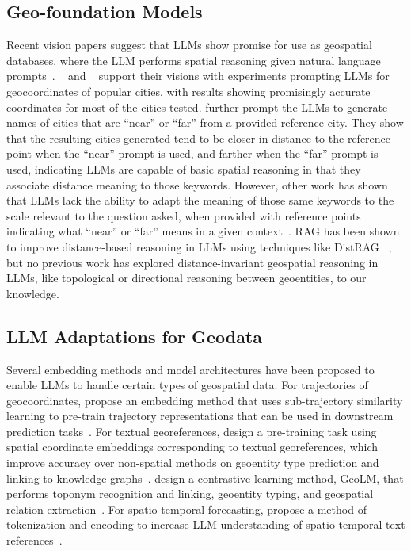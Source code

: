 \subsection{Geo-foundation Models}
Recent vision papers suggest that LLMs show promise for use as geospatial databases, where the LLM performs spatial reasoning given natural language prompts~\cite{Bhandari2023, Qi2023}.
\citeauthor{Bhandari2023}~\cite{Bhandari2023} and \citeauthor{Qi2023}~\cite{Qi2023} support their visions with experiments prompting LLMs for geocoordinates of popular cities, with results showing promisingly accurate coordinates for most of the cities tested.
\citeauthor{Bhandari2023} further prompt the LLMs to generate names of cities that are ``near'' or ``far'' from a provided reference city.
They show that the resulting cities generated tend to be closer in distance to the reference point when the ``near'' prompt is used, and farther when the ``far'' prompt is used, indicating LLMs are capable of basic spatial reasoning in that they associate distance meaning to those keywords.
However, other work has shown that LLMs lack the ability to adapt the meaning of those same keywords to the scale relevant to the question asked, when provided with reference points indicating what ``near'' or ``far'' means in a given context~\cite{Osullivan2024}.
RAG has been shown to improve distance-based reasoning in LLMs using techniques like DistRAG~\cite{Schneider2025b} , but no previous work has explored distance-invariant geospatial reasoning in LLMs, like topological or directional reasoning between geoentities, to our knowledge.


\subsection{LLM Adaptations for Geodata}
Several embedding methods and model architectures have been proposed to enable LLMs to handle certain types of geospatial data.
For trajectories of geocoordinates, \citeauthor{Hu2023} propose an embedding method that uses sub-trajectory similarity learning to pre-train trajectory representations that can be used in downstream prediction tasks~\cite{Hu2023}.
For textual georeferences, \citeauthor{Li2021} design a pre-training task using spatial coordinate embeddings %
corresponding to textual georeferences, which improve accuracy over non-spatial methods on geoentity type prediction and linking to knowledge graphs~\cite{Li2021}.
\citeauthor{Li2023b} design a contrastive learning method, GeoLM, that performs toponym recognition and linking, geoentity typing, and geospatial relation extraction~\cite{Li2023b}.
For spatio-temporal forecasting, \citeauthor{Liu2024large} propose a method of tokenization and encoding to increase LLM understanding of spatio-temporal text references~\cite{Liu2024large}.

